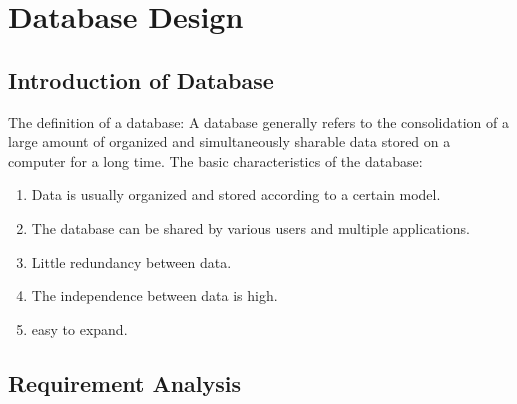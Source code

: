 \section{Database Design}
\subsection{Introduction of Database}

The definition of a database: A database generally refers to the consolidation of a large amount of organized and simultaneously sharable data stored on a computer for a long time.
The basic characteristics of the database:
\begin{enumerate}
    \item Data is usually organized and stored according to a certain model.
    \item The database can be shared by various users and multiple applications.
    \item Little redundancy between data.
    \item The independence between data is high.
    \item easy to expand.
\end{enumerate}
\subsection{Requirement Analysis}

